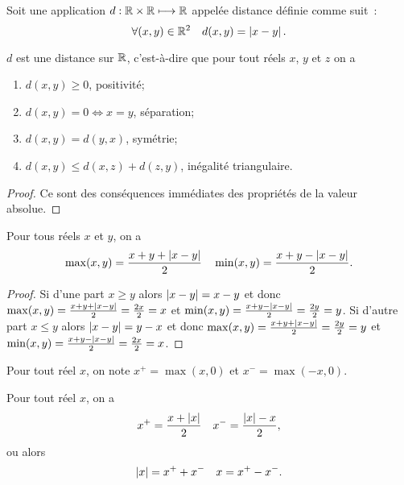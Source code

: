 \begin{defdef}
  Soit une application $d:\mathbb{R}\times\mathbb{R}\longmapsto \mathbb{R}$ appelée distance définie comme suit~:
  \begin{equation}
    \forall (x,y) \in \mathbb{R}^2 \quad d(x,y)=\left\lvert x-y\right\rvert.
  \end{equation}
\end{defdef}
\begin{prop}
  $d$ est une distance sur $\mathbb{R}$, c'est-à-dire que pour tout réels $x$, $y$ et $z$ on a
  \begin{enumerate}
  \item $d(x,y)\geqslant 0$, positivité;
  \item $d(x,y)=0 \iff x=y$, séparation;
  \item $d(x,y)=d(y,x)$, symétrie;
  \item $d(x,y)\leqslant d(x,z)+d(z,y)$, inégalité triangulaire.
  \end{enumerate}
\end{prop}
\begin{proof}
  Ce sont des conséquences immédiates des propriétés de la valeur absolue.
\end{proof}
\begin{prop}
  Pour tous réels $x$ et $y$, on a
  \begin{equation}
    \max(x,y)=\frac{x+y+\left\lvert x-y\right\rvert}{2} \quad \min(x,y)=\frac{x+y-\left\lvert x-y\right\rvert}{2}.
  \end{equation}
\end{prop}
\begin{proof}
  Si d'une part $x\geqslant y$ alors $\left\lvert x-y\right\rvert=x-y$ et donc $\max(x,y)=\frac{x+y+\left\lvert x-y\right\rvert}{2}=\frac{2x}{2}=x$ et $\min(x,y)=\frac{x+y-\left\lvert x-y\right\rvert}{2}=\frac{2y}{2}=y$. Si d'autre part $x\leqslant y$ alors $\left\lvert x-y\right\rvert=y-x$ et donc $\max(x,y)=\frac{x+y+\left\lvert x-y\right\rvert}{2}=\frac{2y}{2}=y$ et $\min(x,y)=\frac{x+y-\left\lvert x-y\right\rvert}{2}=\frac{2x}{2}=x$.
\end{proof}
\begin{defdef}
  Pour tout réel $x$, on note $x^+=\max(x,0)$ et $x^-=\max(-x,0)$.
\end{defdef}
\begin{prop}
  Pour tout réel $x$, on a
  \begin{equation}
    x^+=\frac{x+\left\lvert x\right\rvert}{2} \quad x^-=\frac{\left\lvert x\right\rvert-x}{2},
  \end{equation}
  ou alors
  \begin{equation}
    \left\lvert x\right\rvert=x^++x^- \quad x=x^+-x^-.
  \end{equation}
\end{prop}
